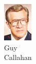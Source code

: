 \begin{figure}[H]
\begin{subfigure}[b]{0.1\textwidth}
                \includegraphics[width=\textwidth]{mugs/CallahanGuy}
                \caption*{Guy \\ Callahan}
        \end{subfigure}
        ~ %
        \begin{subfigure}[b]{0.1\textwidth}

\end{subfigure}
\end{figure}
